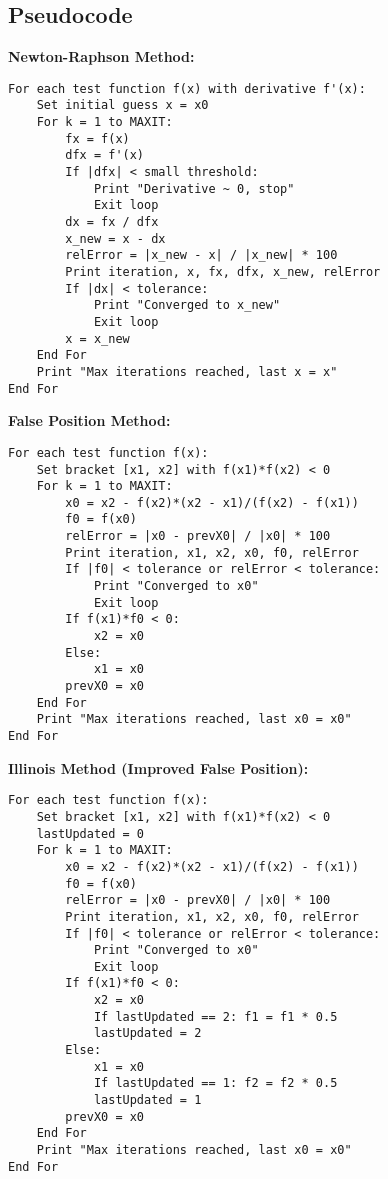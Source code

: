 \documentclass[12pt,a4paper]{article}
\begin{document}
\subsection{Pseudocode}

\textbf{Newton-Raphson Method:}
\begin{verbatim}
For each test function f(x) with derivative f'(x):
    Set initial guess x = x0
    For k = 1 to MAXIT:
        fx = f(x)
        dfx = f'(x)
        If |dfx| < small threshold:
            Print "Derivative ~ 0, stop"
            Exit loop
        dx = fx / dfx
        x_new = x - dx
        relError = |x_new - x| / |x_new| * 100
        Print iteration, x, fx, dfx, x_new, relError
        If |dx| < tolerance:
            Print "Converged to x_new"
            Exit loop
        x = x_new
    End For
    Print "Max iterations reached, last x = x"
End For
\end{verbatim}

\textbf{False Position Method:}
\begin{verbatim}
For each test function f(x):
    Set bracket [x1, x2] with f(x1)*f(x2) < 0
    For k = 1 to MAXIT:
        x0 = x2 - f(x2)*(x2 - x1)/(f(x2) - f(x1))
        f0 = f(x0)
        relError = |x0 - prevX0| / |x0| * 100
        Print iteration, x1, x2, x0, f0, relError
        If |f0| < tolerance or relError < tolerance:
            Print "Converged to x0"
            Exit loop
        If f(x1)*f0 < 0:
            x2 = x0
        Else:
            x1 = x0
        prevX0 = x0
    End For
    Print "Max iterations reached, last x0 = x0"
End For
\end{verbatim}

\textbf{Illinois Method (Improved False Position):}
\begin{verbatim}
For each test function f(x):
    Set bracket [x1, x2] with f(x1)*f(x2) < 0
    lastUpdated = 0
    For k = 1 to MAXIT:
        x0 = x2 - f(x2)*(x2 - x1)/(f(x2) - f(x1))
        f0 = f(x0)
        relError = |x0 - prevX0| / |x0| * 100
        Print iteration, x1, x2, x0, f0, relError
        If |f0| < tolerance or relError < tolerance:
            Print "Converged to x0"
            Exit loop
        If f(x1)*f0 < 0:
            x2 = x0
            If lastUpdated == 2: f1 = f1 * 0.5
            lastUpdated = 2
        Else:
            x1 = x0
            If lastUpdated == 1: f2 = f2 * 0.5
            lastUpdated = 1
        prevX0 = x0
    End For
    Print "Max iterations reached, last x0 = x0"
End For
\end{verbatim}
\end{document}
